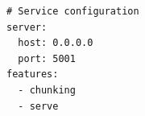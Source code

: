 \documentclass[11pt,a4paper]{article}
\begin{document}
\begin{verbatim}
# Service configuration
server:
  host: 0.0.0.0
  port: 5001
features:
  - chunking
  - serve
\end{verbatim}
\end{document}
